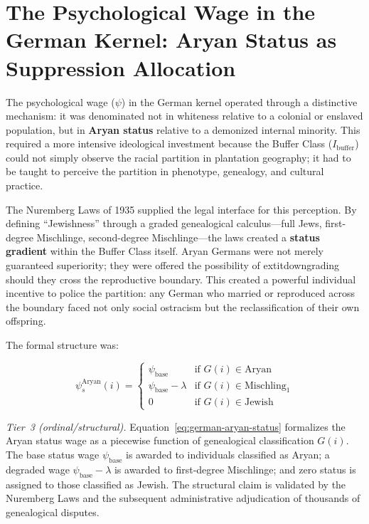 \section{The Psychological Wage in the German Kernel: Aryan Status as Suppression Allocation}
\label{sec:german_psych_wage}

The psychological wage ($\psi$) in the German kernel operated through a distinctive mechanism: it was denominated not in whiteness relative to a colonial or enslaved population, but in \textbf{Aryan status} relative to a demonized internal minority. This required a more intensive ideological investment because the Buffer Class ($I_{\text{buffer}}$) could not simply observe the racial partition in plantation geography; it had to be taught to perceive the partition in phenotype, genealogy, and cultural practice.

The Nuremberg Laws of 1935 supplied the legal interface for this perception. By defining ``Jewishness'' through a graded genealogical calculus---full Jews, first-degree Mischlinge, second-degree Mischlinge---the laws created a \textbf{status gradient} within the Buffer Class itself. Aryan Germans were not merely guaranteed superiority; they were offered the possibility of 	extit{downgrading} should they cross the reproductive boundary. This created a powerful individual incentive to police the partition: any German who married or reproduced across the boundary faced not only social ostracism but the reclassification of their own offspring.

The formal structure was:

\begin{equation}\label{eq:german-aryan-status}
\psi_s^{\text{Aryan}}(i) = \begin{cases}
\psi_{\text{base}} & \text{if } G(i) \in \text{Aryan} \\
\psi_{\text{base}} - \lambda & \text{if } G(i) \in \text{Mischling}_1 \\
0 & \text{if } G(i) \in \text{Jewish}
\end{cases}
\end{equation}

\noindent\textit{Tier~3 (ordinal/structural).} Equation~\ref{eq:german-aryan-status} formalizes the Aryan status wage as a piecewise function of genealogical classification $G(i)$. The base status wage $\psi_{\text{base}}$ is awarded to individuals classified as Aryan; a degraded wage $\psi_{\text{base}} - \lambda$ is awarded to first-degree Mischlinge; and zero status is assigned to those classified as Jewish. The structural claim is validated by the Nuremberg Laws and the subsequent administrative adjudication of thousands of genealogical disputes.

